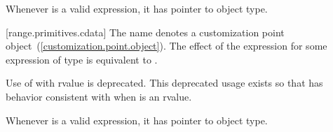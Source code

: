 {\pnum
\remark Whenever  is a valid expression, it
has pointer to object type.

[range.primitives.cdata]{}
\pnum
The name  denotes a customization point
object~(\ref{customization.point.object}). The effect of the expression
 for some expression  of type 
is equivalent to .

\pnum
Use of  with rvalue  is deprecated.
\enternote This deprecated usage exists so that 
has behavior consistent with  when  is
an rvalue. \exitnote

\pnum
\enternote Whenever  is a valid expression, it
has pointer to object type. \exitnote
} %
